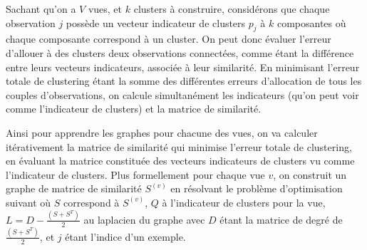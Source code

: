 \documentclass[12pt, french, latin.medieval, a4paper]{report}
\begin{document}

	Sachant qu'on a $V$ vues, et $k$ clusters à construire, considérons que chaque observation $j$ possède un vecteur indicateur de clusters $p_j$ à $k$ composantes où chaque composante correspond à un cluster.
	On peut donc évaluer l'erreur d'allouer à des clusters deux observations connectées, comme étant la différence entre leurs vecteurs indicateurs, associée à leur similarité.
	En minimisant  l'erreur totale de clustering étant la somme des différentes erreurs d'allocation de tous les couples d'observations, on calcule simultanément les indicateurs (qu’on peut voir comme l’indicateur de clusters) et la matrice de similarité.


	Ainsi pour apprendre les graphes pour chacune des vues, on va calculer itérativement la matrice de similarité qui minimise l'erreur totale de clustering, en évaluant la matrice constituée des vecteurs indicateurs de clusters vu comme l’indicateur de clusters.
	Plus formellement pour chaque vue $v$, on construit un graphe de matrice de similarité $S^{(v)}$ en résolvant le problème d'optimisation suivant où
    $S$ correspond à $S^{(v)}$,
	$Q$ à l'indicateur de clusters pour la vue,
	$L = D - \frac{(S + S^T)}{2}$ au laplacien du graphe avec $D$ étant la matrice de degré de $\frac{(S + S^T)}{2}$,
    et $j$ étant l'indice d'un exemple.
    
\end{document}
